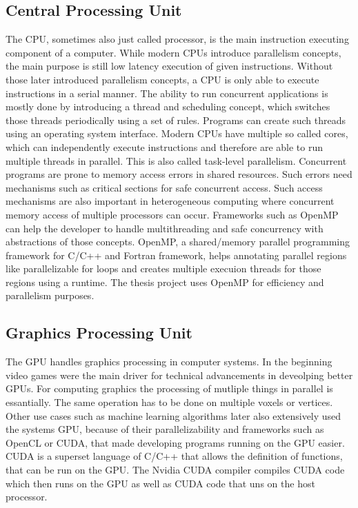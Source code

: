 \subsection{Central Processing Unit}
The \acrshort{CPU}, sometimes also just called processor, is the main instruction executing component of a computer. While modern \acrshort{CPU}s introduce parallelism concepts, the main purpose is still low latency execution of given instructions.
Without those later introduced parallelism concepts, a \acrshort{CPU} is only able to execute instructions in a serial manner. The ability to run concurrent applications is mostly done by introducing a thread and scheduling concept, which switches those threads periodically using a set of rules. Programs can create such threads using an operating system interface.
Modern \acrshort{CPU}s have multiple so called cores, which can independently execute instructions and therefore are able to run multiple threads in parallel. This is also called task-level parallelism.
Concurrent programs are prone to memory access errors in shared resources. Such errors need mechanisms such as critical sections for safe concurrent access. Such access mechanisms are also important in heterogeneous computing where concurrent memory access of multiple processors can occur.
Frameworks such as OpenMP can help the developer to handle multithreading and safe concurrency with abstractions of those concepts. OpenMP, a shared/memory parallel programming framework for C/C++ and Fortran framework, helps annotating parallel regions like parallelizable for loops and creates multiple execuion threads for those regions using a runtime.
The thesis project uses OpenMP for efficiency and parallelism purposes.

\subsection{Graphics Processing Unit}
The \acrshort{GPU} handles graphics processing in computer systems. In the beginning video games were the main driver for technical advancements in deveolping better \acrshort{GPU}s. For computing graphics the processing of mutliple things in parallel is essantially. The same operation has to be done on multiple voxels or vertices. Other use cases such as machine learning algorithms later also extensively used the systems \acrshort{GPU}, because of their parallelizability and frameworks such as OpenCL or CUDA, that made developing programs running on the GPU easier.
CUDA is a superset language of C/C++ that allows the definition of functions, that can be run on the \acrshort{GPU}. The Nvidia CUDA compiler compiles CUDA code which then runs on the GPU as well as CUDA code that uns on the host processor.


